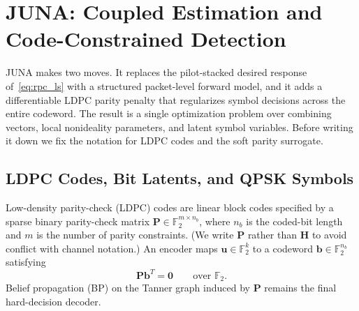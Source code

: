 \documentclass{wileysev}
\newcommand{\F}{\mathbb{F}}
\begin{document}
	\section{JUNA: Coupled Estimation and Code-Constrained Detection}
	\label{chap:juna}
	
	JUNA makes two moves. It replaces the pilot-stacked desired response of~\eqref{eq:rpc_ls} with a structured packet-level forward model, and it adds a differentiable LDPC parity penalty that regularizes symbol decisions across the entire codeword. The result is a single optimization problem over combining vectors, local nonideality parameters, and latent symbol variables. Before writing it down we fix the notation for LDPC codes and the soft parity surrogate.
	
	
	\subsection{LDPC Codes, Bit Latents, and QPSK Symbols}
	\label{ssec:ldpc}
	
	Low-density parity-check (LDPC) codes are linear block codes specified by a sparse binary parity-check matrix \(\mathbf P\in\F_2^{m\times n_b}\), where \(n_b\) is the coded-bit length and \(m\) is the number of parity constraints. (We write \(\mathbf P\) rather than \(\mathbf H\) to avoid conflict with channel notation.) An encoder maps \(\mathbf u\in\F_2^k\) to a codeword \(\mathbf b\in\F_2^{n_b}\) satisfying
	\begin{equation}
		\mathbf P\mathbf b^{T}=\mathbf 0
		\qquad\text{over }\F_2 .
	\end{equation}
	Belief propagation (BP) on the Tanner graph induced by \(\mathbf P\) remains the final hard-decision decoder. 
	
\end{document}

